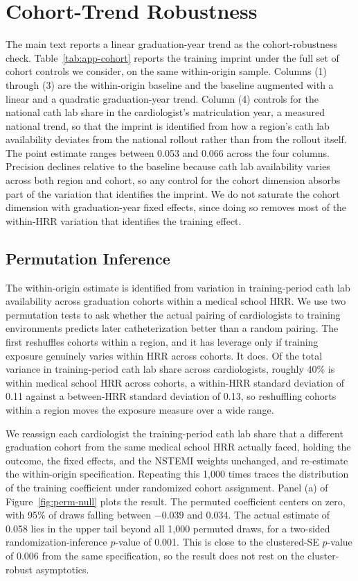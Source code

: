 \documentclass[12pt]{article}
\begin{document}
\section{Cohort-Trend Robustness}\label{sec:app-cohort}

The main text reports a linear graduation-year trend as the cohort-robustness check. Table~\ref{tab:app-cohort} reports the training imprint under the full set of cohort controls we consider, on the same within-origin sample. Columns (1) through (3) are the within-origin baseline and the baseline augmented with a linear and a quadratic graduation-year trend. Column (4) controls for the national cath lab share in the cardiologist's matriculation year, a measured national trend, so that the imprint is identified from how a region's cath lab availability deviates from the national rollout rather than from the rollout itself. The point estimate ranges between 0.053 and 0.066 across the four columns. Precision declines relative to the baseline because cath lab availability varies across both region and cohort, so any control for the cohort dimension absorbs part of the variation that identifies the imprint. We do not saturate the cohort dimension with graduation-year fixed effects, since doing so removes most of the within-HRR variation that identifies the training effect.

\subsection{Permutation Inference}

The within-origin estimate is identified from variation in training-period cath lab availability across graduation cohorts within a medical school HRR. We use two permutation tests to ask whether the actual pairing of cardiologists to training environments predicts later catheterization better than a random pairing. The first reshuffles cohorts within a region, and it has leverage only if training exposure genuinely varies within HRR across cohorts. It does. Of the total variance in training-period cath lab share across cardiologists, roughly 40\% is within medical school HRR across cohorts, a within-HRR standard deviation of 0.11 against a between-HRR standard deviation of 0.13, so reshuffling cohorts within a region moves the exposure measure over a wide range.

We reassign each cardiologist the training-period cath lab share that a different graduation cohort from the same medical school HRR actually faced, holding the outcome, the fixed effects, and the NSTEMI weights unchanged, and re-estimate the within-origin specification. Repeating this 1,000 times traces the distribution of the training coefficient under randomized cohort assignment. Panel (a) of Figure~\ref{fig:perm-null} plots the result. The permuted coefficient centers on zero, with 95\% of draws falling between $-0.039$ and 0.034. The actual estimate of 0.058 lies in the upper tail beyond all 1,000 permuted draws, for a two-sided randomization-inference $p$-value of 0.001. This is close to the clustered-SE $p$-value of 0.006 from the same specification, so the result does not rest on the cluster-robust asymptotics.
\end{document}

